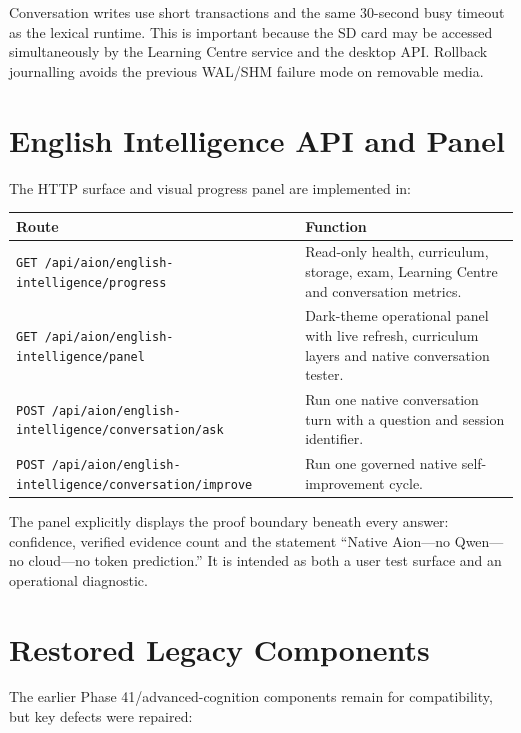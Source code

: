 \documentclass[11pt,a4paper]{article}
\begin{document}
Conversation writes use short transactions and the same 30-second busy timeout as the lexical
runtime. This is important because the SD card may be accessed simultaneously by the Learning
Centre service and the desktop API. Rollback journalling avoids the previous WAL/SHM failure
mode on removable media.

\section{English Intelligence API and Panel}

The HTTP surface and visual progress panel are implemented in:

\begin{quote}
\end{quote}

\begin{longtable}{p{} p{}}
\toprule
Route & Function \\
\midrule
\endhead
\texttt{GET /api/aion/english-intelligence/progress} & Read-only health, curriculum, storage,
exam, Learning Centre and conversation metrics. \\
\texttt{GET /api/aion/english-intelligence/panel} & Dark-theme operational panel with live
refresh, curriculum layers and native conversation tester. \\
\texttt{POST /api/aion/english-intelligence/conversation/ask} & Run one native conversation
turn with a question and session identifier. \\
\texttt{POST /api/aion/english-intelligence/conversation/improve} & Run one governed native
self-improvement cycle. \\
\bottomrule
\end{longtable}

The panel explicitly displays the proof boundary beneath every answer: confidence, verified
evidence count and the statement ``Native Aion---no Qwen---no cloud---no token prediction.''
It is intended as both a user test surface and an operational diagnostic.

\section{Restored Legacy Components}

The earlier Phase 41/advanced-cognition components remain for compatibility, but key defects
were repaired:
\end{document}
